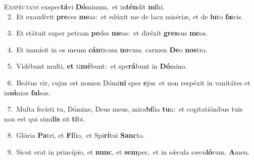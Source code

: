 \lettrine{\initial\textcolor{\initialcolor}{E}}{xspéctans} exspec\-\textbf{tá}\-vi \textbf{Dó}\-minum,~\star et in\-\textbf{tén}\-dit \textbf{mi}\-hi.\\
{\numbfont\textcolor{\numbcolor}{~2.}}~Et exaudívit \textbf{pre}\-ces \textbf{me}\-as:~\star et edúxit me de lacu misériæ, et de \textbf{lu}\-to \textbf{fæ}\-cis.\par
{\numbfont\textcolor{\numbcolor}{~3.}}~Et státuit super petram \textbf{pe}\-des \textbf{me}\-os:~\star et diréxit \textbf{gres}\-sus \textbf{me}\-os.\par
{\numbfont\textcolor{\numbcolor}{~4.}}~Et immísit in os meum \textbf{cán}\-ticum \textbf{no}\-vum~\star carmen \textbf{De}\-o \textbf{nos}\-tro.\par
{\numbfont\textcolor{\numbcolor}{~5.}}~Vidébunt multi, \textbf{et} ti\-\textbf{mé}\-bunt:~\star et spe\-\textbf{rá}\-bunt in \textbf{Dó}\-mino.\par
{\numbfont\textcolor{\numbcolor}{~6.}}~Beátus vir, cujus est nomen Dómi\textbf{ni} spes \textbf{e}\-jus~\star et non respéxit in vanitátes et in\-\textbf{sá}\-nias \textbf{fal}\-sas.\par
{\numbfont\textcolor{\numbcolor}{~7.}}~Multa fecísti tu, Dómine, Deus meus, mira\-\textbf{bí}\-lia \textbf{tu}\-a:~\star et cogitatiónibus tuis non est qui sími\textbf{lis} sit \textbf{ti}\-bi.\par
{\numbfont\textcolor{\numbcolor}{~8.}}~Glória \textbf{Pa}\-tri, et \textbf{Fí}\-lio,~\star et Spi\-\textbf{rí}\-tui \textbf{Sanc}\-to.\par
{\numbfont\textcolor{\numbcolor}{~9.}}~Sicut erat in princípio, et \textbf{nunc}\-, et \textbf{sem}\-per,~\star et in sǽcula sæcu\-\textbf{ló}\-rum. \textbf{A}\-men.\par
